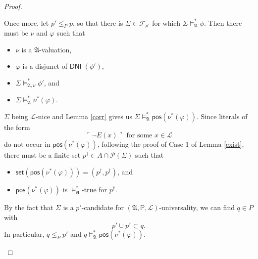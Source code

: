 \documentclass[12pt]{article}
\numberwithin{equation}{section}
\begin{document}
\begin{proof}
\begin{enumerate}[label=Case \arabic*:, leftmargin=50pt]
    Once more, let $p' \leq_{P} p$, so that there is $\Sigma \in \mathcal{F}_{p'}$ for which $\Sigma \models^{*}_{\mathfrak{A}} \phi$. Then there must be $\nu$ and $\varphi$ such that
    \begin{itemize}
        \item $\nu$ is a $\mathfrak{A}$-valuation,
        \item $\varphi$ is a disjunct of $\mathsf{DNF}(\phi')$,
        \item $\Sigma \models^{*}_{\mathfrak{A}, \nu} \phi'$, and
        \item $\Sigma \models^{*}_{\mathfrak{A}} \nu^*(\varphi)$.
    \end{itemize}
    $\Sigma$ being $\mathcal{L}$-nice and Lemma \ref{corr} gives us $\Sigma \models^{*}_{\mathfrak{A}} \mathsf{pos}(\nu^*(\varphi))$. Since literals of the form $$\ulcorner \neg E(x) \urcorner \text{ for some } x \in \mathcal{L}$$ do not occur in $\mathsf{pos}(\nu^*(\varphi))$, following the proof of Case 1 of Lemma \ref{exist}, there must be a finite set $p^{\dagger} \in A \cap \mathcal{P}(\Sigma)$ such that 
    \begin{itemize}
        \item $\mathsf{set}(\mathsf{pos}(\nu^*(\varphi))) = (p^{\dagger}, p^{\dagger})$, and 
        \item $\mathsf{pos}(\nu^*(\varphi))$ is $\models^{*}_{\mathfrak{A}}$-true for $p^{\dagger}$. 
    \end{itemize}
    By the fact that $\Sigma$ is a $p'$-candidate for $(\mathfrak{A}, \mathbb{P}, \mathcal{L})$-universality, we can find $q \in P$ with $$p' \cup p^{\dagger} \subset q.$$ In particular, $q \leq_P p'$ and $q \models^{*}_{\mathfrak{A}} \mathsf{pos}(\nu^*(\varphi))$. 
    

\end{enumerate}
\end{proof}
\end{document}
